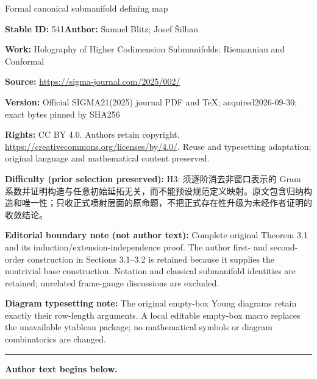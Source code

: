 \documentclass[11pt]{article}
\numberwithin{equation}{section}
\renewcommand{\=}{\stackrel \Lambda =}
\begin{document}
\begin{center}\Large Formal canonical submanifold defining map\end{center}
\noindent\textbf{Stable ID:} 541\quad\textbf{Author:} Samuel Blitz; Josef Šilhan\par
\noindent\textbf{Work:} Holography of Higher Codimension Submanifolds: Riemannian and Conformal\par
\noindent\textbf{Source:} \url{https://sigma-journal.com/2025/002/}\par
\noindent\textbf{Version:} Official SIGMA21(2025) journal PDF and TeX; acquired2026-09-30; exact bytes pinned by SHA256\par
\noindent\textbf{Rights:} CC BY 4.0. Authors retain copyright. \url{https://creativecommons.org/licenses/by/4.0/}. Reuse and typesetting adaptation; original language and mathematical content preserved.\par
\noindent\textbf{Difficulty (prior selection preserved):} {\CJKfont H3: 须逐阶消去非窗口表示的 Gram 系数并证明构造与任意初始延拓无关，而不能预设规范定义映射。原文包含归纳构造和唯一性；只收正式喷射层面的原命题，不把正式存在性升级为未经作者证明的收敛结论。}\par
\medskip\noindent\textbf{Editorial boundary note (not author text):} Complete original Theorem 3.1 and its induction/extension-independence proof. The author first- and second-order construction in Sections 3.1–3.2 is retained because it supplies the nontrivial base construction. Notation and classical submanifold identities are retained; unrelated frame-gauge discussions are excluded.\par
\noindent\textbf{Diagram typesetting note:} The original empty-box Young diagrams retain exactly their row-length arguments. A local editable empty-box macro replaces the unavailable ytableau package; no mathematical symbols or diagram combinatorics are changed.\par
\medskip\hrule\medskip\noindent\textbf{Author text begins below.}\par
\setcounter{section}{1}\setcounter{subsection}{0}
\end{document}
